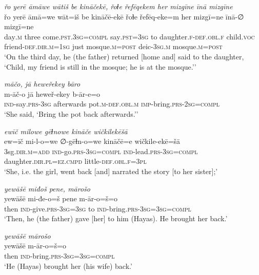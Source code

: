 \ea \label{ŽH.37}
\textit{řo yerē āmāwe wātiš be kināčekē, řoɫe řefēqekem her mizgīne īnā mizgīne} \\ 
\gll řo yerē āmā=we wāt=iš be kināčē-ekē řoɫe řefēq-eke=m her mizgī=ne īnā-∅ mizgī=ne \\ 
 day\textsc{.m} three come\textsc{.pst}\textsc{.3sg}\textsc{=compl} say\textsc{.pst}\textsc{=3sg} to daughter\textsc{\textsc{.f}}\textsc{-def}\textsc{.obl}\textsc{\textsc{.f}} child.\textsc{voc} friend\textsc{-def}\textsc{.dir}\textsc{.m}\textsc{=1sg} just mosque\textsc{.m}\textsc{=\textsc{post}} deic\textsc{-3sg}\textsc{.m} mosque\textsc{.m}\textsc{=\textsc{post}} \\ 
\glt `On the third day, he (the father) returned [home and] said to the daughter, ‘Child, my friend is still in the mosque; he is at the mosque.’'
\z 
 
\ea \label{ŽH.44}
\textit{māčo, jā heweřekey bāro} \\ 
\gll m-āč-o jā heweř-ekey b-ār-e=o \\ 
 \textsc{ind-}say\textsc{.prs}\textsc{-3sg} afterwards pot\textsc{.m}\textsc{-def}\textsc{.obl}\textsc{.m} \textsc{imp-}bring\textsc{.prs}-\textsc{2sg}\textsc{=compl} \\ 
\glt `She said, ‘Bring the pot back afterwards.’'
\z 
 
\ea \label{ŽH.46}
\textit{ewīč milowe gēɫnowe kināče wičkilekēšā} \\ 
\gll ew=īč mi-l-o=we ∅-gēɫn-o=we kināčē=e wičkile-ekē=šā \\ 
 3sg\textsc{.dir}\textsc{.m}\textsc{=add} \textsc{ind-}go\textsc{.prs}\textsc{-3sg}\textsc{=compl} \textsc{ind-}lead\textsc{.prs}\textsc{-3sg}\textsc{=compl} daughter\textsc{.dir}\textsc{.pl}\textsc{=ez}\textsc{.cmpd} little\textsc{-def}\textsc{.obl}\textsc{\textsc{.f}}\textsc{=3pl} \\ 
\glt `She, i.e. the girl, went back [and] narrated the story [to her sister];'
\z 
 
\ea \label{ŽH.61}
\textit{yewāšē miđoš pene, mārošo} \\ 
\gll yewāšē mi-đe-o=š pene m-ār-o=š=o \\ 
 then \textsc{ind-}give\textsc{.prs}\textsc{-3sg}\textsc{=3sg} to \textsc{ind-}bring\textsc{.prs}\textsc{-3sg}\textsc{=3sg}\textsc{=compl} \\ 
\glt `Then, he (the father) gave [her] to him (Hayas). He brought her back.'
\z 
 
\ea \label{ŽH.63}
\textit{yewāšē mārošo} \\ 
\gll yewāšē m-ār-o=š=o \\ 
 then \textsc{ind-}bring\textsc{.prs}\textsc{-3sg}\textsc{=3sg}\textsc{=compl} \\ 
\glt `He (Hayas) brought her (his wife) back.'
\z 
 
